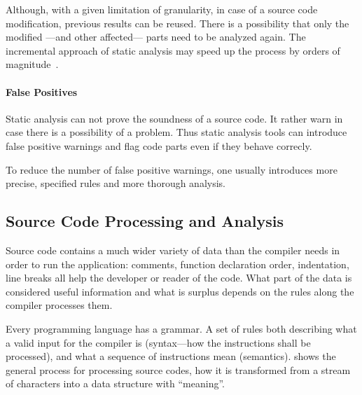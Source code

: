 Although, with a given limitation of granularity, in case of a source code modification, previous results can be reused. There is a possibility that only the modified ---and other affected--- parts need to be analyzed again. The incremental approach of static analysis may speed up the process by orders of magnitude~\cite{stein-daniel-bsc}.

\paragraph{False Positives} Static analysis can not prove the soundness of a source code. It rather warn in case there is a possibility of a problem. Thus static analysis tools can introduce false positive warnings and flag code parts even if they behave correcly.

To reduce the number of false positive warnings, one usually introduces more precise, specified rules and more thorough analysis.

%
%

\subsection{Source Code Processing and Analysis}
\label{sect:source-code-processing}
Source code contains a much wider variety of data than the compiler needs in order to run the application: comments, function declaration order, indentation, line breaks all help the developer or reader of the code. What part of the data is considered useful information and what is surplus depends on the rules along the compiler processes them.

Every programming language has a grammar. A set of rules both describing what a valid input for the compiler is (syntax---how the instructions shall be processed), and what a sequence of instructions mean (semantics).  shows the general process for processing source codes, how it is transformed from a stream of characters into a data structure with ``meaning''.

